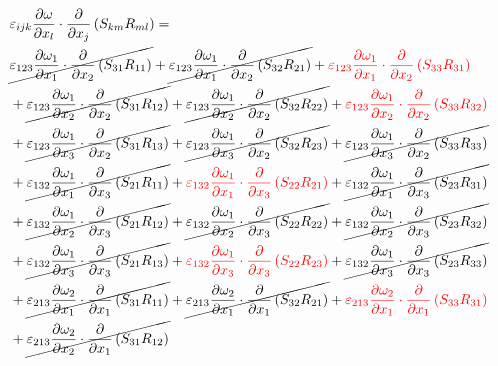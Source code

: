 \begin{equation}
	\begin{split}
		 & \varepsilon_{ijk}\pdv{\omega}{x_{l}} \cdot\pdv{}{x_{j}}\left(S_{km}R_{ml}\right) =  \\ 
		&\cancel{\varepsilon_{123}\pdv{\omega_{1}}{x_{1}}\cdot\pdv{}{x_{2}}\left(S_{31}R_{11}\right)
}		+\cancel{\varepsilon_{123}\pdv{\omega_{1}}{x_{1}}\cdot\pdv{}{x_{2}}\left(S_{32}R_{21}\right)
}		+{\color{red}\varepsilon_{123}\pdv{\omega_{1}}{x_{1}}\cdot\pdv{}{x_{2}}\left(S_{33}R_{31}\right)
}\\ 
		&+\cancel{\varepsilon_{123}\pdv{\omega_{1}}{x_{2}}\cdot\pdv{}{x_{2}}\left(S_{31}R_{12}\right)
}		+\cancel{\varepsilon_{123}\pdv{\omega_{1}}{x_{2}}\cdot\pdv{}{x_{2}}\left(S_{32}R_{22}\right)
}		+{\color{red}\varepsilon_{123}\pdv{\omega_{1}}{x_{2}}\cdot\pdv{}{x_{2}}\left(S_{33}R_{32}\right)
}\\ 
		&+\cancel{\varepsilon_{123}\pdv{\omega_{1}}{x_{3}}\cdot\pdv{}{x_{2}}\left(S_{31}R_{13}\right)
}		+\cancel{\varepsilon_{123}\pdv{\omega_{1}}{x_{3}}\cdot\pdv{}{x_{2}}\left(S_{32}R_{23}\right)
}		+\cancel{\varepsilon_{123}\pdv{\omega_{1}}{x_{3}}\cdot\pdv{}{x_{2}}\left(S_{33}R_{33}\right)
}\\ 
		&+\cancel{\varepsilon_{132}\pdv{\omega_{1}}{x_{1}}\cdot\pdv{}{x_{3}}\left(S_{21}R_{11}\right)
}		+{\color{red}\varepsilon_{132}\pdv{\omega_{1}}{x_{1}}\cdot\pdv{}{x_{3}}\left(S_{22}R_{21}\right)
}		+\cancel{\varepsilon_{132}\pdv{\omega_{1}}{x_{1}}\cdot\pdv{}{x_{3}}\left(S_{23}R_{31}\right)
}\\ 
		&+\cancel{\varepsilon_{132}\pdv{\omega_{1}}{x_{2}}\cdot\pdv{}{x_{3}}\left(S_{21}R_{12}\right)
}		+\cancel{\varepsilon_{132}\pdv{\omega_{1}}{x_{2}}\cdot\pdv{}{x_{3}}\left(S_{22}R_{22}\right)
}		+\cancel{\varepsilon_{132}\pdv{\omega_{1}}{x_{2}}\cdot\pdv{}{x_{3}}\left(S_{23}R_{32}\right)
}\\ 
		&+\cancel{\varepsilon_{132}\pdv{\omega_{1}}{x_{3}}\cdot\pdv{}{x_{3}}\left(S_{21}R_{13}\right)
}		+{\color{red}\varepsilon_{132}\pdv{\omega_{1}}{x_{3}}\cdot\pdv{}{x_{3}}\left(S_{22}R_{23}\right)
}		+\cancel{\varepsilon_{132}\pdv{\omega_{1}}{x_{3}}\cdot\pdv{}{x_{3}}\left(S_{23}R_{33}\right)
}\\ 
		&+\cancel{\varepsilon_{213}\pdv{\omega_{2}}{x_{1}}\cdot\pdv{}{x_{1}}\left(S_{31}R_{11}\right)
}		+\cancel{\varepsilon_{213}\pdv{\omega_{2}}{x_{1}}\cdot\pdv{}{x_{1}}\left(S_{32}R_{21}\right)
}		+{\color{red}\varepsilon_{213}\pdv{\omega_{2}}{x_{1}}\cdot\pdv{}{x_{1}}\left(S_{33}R_{31}\right)
}\\ 
		&+\cancel{\varepsilon_{213}\pdv{\omega_{2}}{x_{2}}\cdot\pdv{}{x_{1}}\left(S_{31}R_{12}\right)
}
\end{split}
\end{equation}

